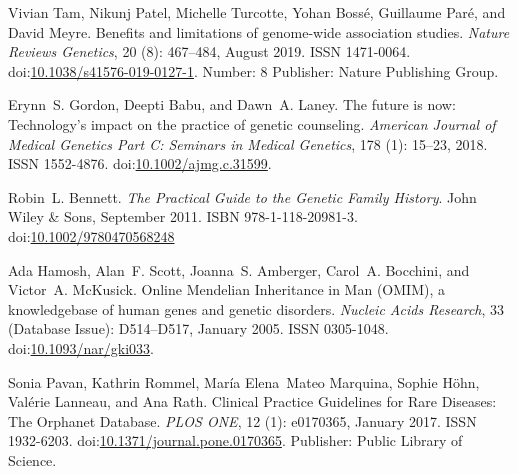 \documentclass{eptcs}
\providecommand{\urlalt}[2]{\href{#1}{#2}}
\providecommand{\doi}[1]{doi:\urlalt{http://dx.doi.org/#1}{#1}}
\begin{document}
\begin{thebibliography}{}
Vivian Tam, Nikunj Patel, Michelle Turcotte, Yohan Bossé, Guillaume Paré, and David Meyre.
\newblock Benefits and limitations of genome-wide association studies.
\newblock \emph{Nature Reviews Genetics}, 20 (8): 467--484, August 2019.
\newblock ISSN 1471-0064.
\newblock \doi{10.1038/s41576-019-0127-1}.
\newblock Number: 8 Publisher: Nature Publishing Group.

Erynn~S. Gordon, Deepti Babu, and Dawn~A. Laney.
\newblock The future is now: {Technology}'s impact on the practice of genetic counseling.
\newblock \emph{American Journal of Medical Genetics Part C: Seminars in Medical Genetics}, 178 (1): 15--23, 2018.
\newblock ISSN 1552-4876.
\newblock \doi{10.1002/ajmg.c.31599}.

Robin~L. Bennett.
\newblock \emph{The {Practical} {Guide} to the {Genetic} {Family} {History}}.
\newblock John Wiley \& Sons, September 2011.
\newblock ISBN 978-1-118-20981-3.
\newblock \doi{10.1002/9780470568248}

Ada Hamosh, Alan~F. Scott, Joanna~S. Amberger, Carol~A. Bocchini, and Victor~A. McKusick.
\newblock Online {Mendelian} {Inheritance} in {Man} ({OMIM}), a knowledgebase of human genes and genetic disorders.
\newblock \emph{Nucleic Acids Research}, 33 (Database Issue): D514--D517, January 2005.
\newblock ISSN 0305-1048.
\newblock \doi{10.1093/nar/gki033}.

Sonia Pavan, Kathrin Rommel, María Elena~Mateo Marquina, Sophie Höhn, Valérie Lanneau, and Ana Rath.
\newblock Clinical {Practice} {Guidelines} for {Rare} {Diseases}: {The} {Orphanet} {Database}.
\newblock \emph{PLOS ONE}, 12 (1): e0170365, January 2017.
\newblock ISSN 1932-6203.
\newblock \doi{10.1371/journal.pone.0170365}.
\newblock Publisher: Public Library of Science.



\end{thebibliography}
\end{document}
